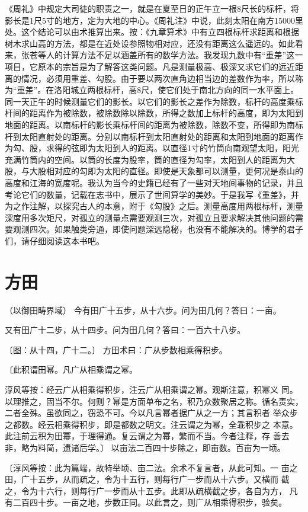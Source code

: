 \documentclass[12pt,UTF8]{ctexbook}
\begin{document}
《周礼》中规定大司徒的职责之一，就是在夏至日的正午立一根8尺长的标杆，将影长是1尺5寸的地方，定为大地的中心。《周礼注》中说，此刻太阳在南方15000里处。这个结论可以由术推算出来。按：《九章算术》中有立四根标杆求距离和根据树木求山高的方法，都是在近处设参照物相对应，还没有距离这么遥远的。如此看来，张苍等人的计算方法不足以涵盖所有的数学方法。我发现九数中有“重差”这一项目，它原本的宗旨是为了解答这类问题。凡是测量极高、极深又求它们的远近距离的情况，必须用重差、勾股。由于要以两次直角边相当边的差数作为率，所以称为“重差”。在洛阳城立两根标杆，高8尺，使它们处于南北方向的同一水平面上。同一天正午的时候测量它们的影长。以它们的影长之差作为除数，标杆的高度乘标杆间的距离作为被除数，被除数除以除数，所得之数加上标杆的高度，即为太阳到地面的距离。以南标杆的影长乘标杆间的距离为被除数，除数不变，所得即为南标杆到太阳直射处的距离。分别以南标杆到太阳直射处的距离和太阳到地面的距离作为勾、股，求得的弦即为太阳到人的距离。以直径1寸的竹筒向南观望太阳，阳光充满竹筒内的空间。以筒的长度为股率，筒的直径为勾率，太阳到人的距离为大股，与大股相对应的勾即为太阳的直径。即使是天象都可以测量，更何况是泰山的高度和江海的宽度呢。我认为当今的史籍已经有了一些对天地间事物的记录，并且考论它们的数量，记载在志书中，展示了世间算学的美妙。于是我写《重差》，并为之作注解，以探究古人的本意，附于《勾股》之后。测量高度用两根标杆，测量深度用多次矩尺，对孤立的测量点需要观测三次，对孤立且要求解决其他问题的需要观测四次。如果触类旁通，即使问题深远隐秘，也没有不能解决的。博学的君子们，请仔细阅读这本书吧。

\mainmatter
\chapter{方田}

（以御田畴界域） 今有田广十五步，从十六步。问为田几何？答曰：一亩。

又有田广十二步，从十四步。问为田几何？答曰：一百六十八步。

〔图：从十四，广十二。〕 方田术曰：广从步数相乘得积步。

〔此积谓田幂。凡广从相乘谓之幂。

淳风等按：经云广从相乘得积步，注云广从相乘谓之幂。观斯注意，积幂义 同。以理推之，固当不尔。何则？幂是方面单布之名，积乃众数聚居之称。循名责实，二者全殊。虽欲同之，窃恐不可。今以凡言幂者据广从之一方；其言积者 举众步之都数。经云相乘得积步，即是都数之明文。注云谓之为幂，全乖积步之 本意。此注前云积为田幂，于理得通。复云谓之为幂，繁而不当。今者注释，存 善去非，略为料简，遗诸后学。〕 以亩法二百四十步除之，即亩数。百亩为一顷。

〔淳风等按：此为篇端，故特举顷、亩二法。余术不复言者，从此可知。一 亩之田，广十五步，从而疏之，令为十五行，则每行广一步而从十六步。又横而 截之，令为十六行，则每行广一步而从十五步。此即从疏横截之步，各自为方， 凡有二百四十步。一亩之地，步数正同。以此言之，则广从相乘得积步，验矣。
\end{document}
